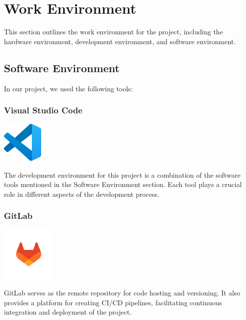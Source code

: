 \section{Work Environment}

This section outlines the work environment for the project, including the hardware environment, development environment, and software environment.

\subsection{Software Environment}

In our project, we used the following tools:

\subsubsection*{Visual Studio Code}
\begin{center}
\includegraphics[width=0.15\textwidth]{Images/logos/vscode.png}
\label{fig:vscode}
\end{center}
The development environment for this project is a combination of the software tools mentioned in the Software Environment section. Each tool plays a crucial role in different aspects of the development process.

\clearpage

\subsubsection*{GitLab}
\begin{center}
\includegraphics[width=0.2\textwidth]{Images/logos/gitlab-logo-500.png}
\label{fig:gitlab}
\end{center}
GitLab serves as the remote repository for code hosting and versioning. It also provides a platform for creating CI/CD pipelines, facilitating continuous integration and deployment of the project.

